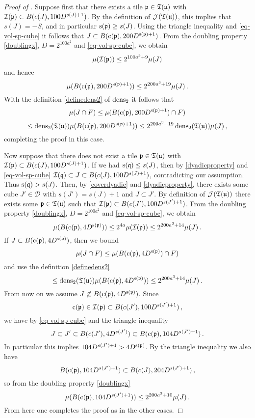 \begin{proof}[Proof of ]
    Suppose first that there exists a tile ${\mathfrak p} \in {\mathfrak T}({\mathfrak u})$ with ${\mathcal{I}}({\mathfrak p}) \subset B(c(J), 100 D^{s(J) + 1})$. By the definition of $\mathcal{J}({\mathfrak T}({\mathfrak u}))$, this implies that $s(J) = -S$, and in particular ${\mathrm{s}}({\mathfrak p}) \ge s(J)$. Using the triangle inequality and \eqref{eq-vol-sp-cube} it follows that $J \subset B({\mathrm{c}}({\mathfrak p}), 200 D^{{\mathrm{s}}({\mathfrak p}) + 1})$. From the doubling property \eqref{doublingx}, $D=2^{100a^2}$ and \eqref{eq-vol-sp-cube}, we obtain
    $$
        \mu({\mathcal{I}}({\mathfrak p})) \le 2^{100a^3 + 9} \mu(J)
    $$
    and hence
    $$
        \mu( B({\mathrm{c}}({\mathfrak p}), 200 D^{{\mathrm{s}}({\mathfrak p}) + 1})) \le 2^{200a^3 +19} \mu(J)\,.
    $$
    With the definition \eqref{definedens2} of $\operatorname{\operatorname{dens}}_2$ it follows that
    $$
        \mu(J \cap F) \le \mu( B({\mathrm{c}}({\mathfrak p}), 200 D^{{\mathrm{s}}({\mathfrak p}) + 1}) \cap F)
    $$
    $$
        \le \operatorname{\operatorname{dens}}_2({\mathfrak T}({\mathfrak u})) \mu( B({\mathrm{c}}({\mathfrak p}), 200 D^{{\mathrm{s}}({\mathfrak p}) + 1})) \le 2^{200a^3 +19} \operatorname{\operatorname{dens}}_2({\mathfrak T}({\mathfrak u}))\mu(J)\,,
    $$
    completing the proof in this case.

    Now suppose that there does not exist a tile ${\mathfrak p} \in {\mathfrak T}({\mathfrak u})$ with ${\mathcal{I}}({\mathfrak p}) \subset B(c(J), 100 D^{s(J) + 1})$. If we had ${\mathrm{s}}({\mathfrak q}) \le s(J)$, then by \eqref{dyadicproperty} and \eqref{eq-vol-sp-cube} ${\mathcal{I}}({\mathfrak q}) \subset J \subset B(c(J), 100 D^{s(J) + 1})$, contradicting our assumption. Thus ${\mathrm{s}}({\mathfrak q}) > s(J)$. Then, by \eqref{coverdyadic} and \eqref{dyadicproperty}, there exists some cube $J' \in \mathcal{D}$ with $s(J') = s(J) + 1$ and $J \subset J'$. By definition of $\mathcal{J}({\mathfrak T}({\mathfrak u}))$ there exists some ${\mathfrak p} \in {\mathfrak T}({\mathfrak u})$ such that ${\mathcal{I}}({\mathfrak p}) \subset B(c(J'), 100 D^{s(J') + 1})$. From the doubling property \eqref{doublingx}, $D=2^{100a^2}$ and \eqref{eq-vol-sp-cube}, we obtain
    \begin{equation}
        \label{eq-measure-comparison-1}
        \mu(B({\mathrm{c}}({\mathfrak p}), 4D^{{\mathrm{s}}({\mathfrak p})})) \le 2^{4a} \mu({\mathcal{I}}({\mathfrak p})) \le 2^{200a^3 + 14} \mu(J)\,.
    \end{equation}
    If $J \subset B({\mathrm{c}}({\mathfrak p}), 4 D^{{\mathrm{s}}({\mathfrak p})})$, then we bound
    $$
        \mu(J \cap F) \le \mu(B({\mathrm{c}}({\mathfrak p}), 4D^{{\mathrm{s}}({\mathfrak p})}) \cap F)
    $$
    and use the definition \eqref{definedens2}
    $$
        \le \operatorname{\operatorname{dens}}_2({\mathfrak T}({\mathfrak u})) \mu(B({\mathrm{c}}({\mathfrak p}), 4D^{{\mathrm{s}}({\mathfrak p})})) \le 2^{200a^3 + 14} \mu(J)\,.
    $$
    From now on we assume $J \not \subset B({\mathrm{c}}({\mathfrak p}), 4 D^{{\mathrm{s}}({\mathfrak p})})$.
    Since
    \begin{equation*}
        {\mathrm{c}}({\mathfrak p}) \in {\mathcal{I}}({\mathfrak p}) \subset B(c(J'), 100 D^{s(J') + 1})\, ,
    \end{equation*}
    we have by \eqref{eq-vol-sp-cube} and the triangle inequality
    $$
        J \subset J' \subset B(c(J'), 4D^{s(J')}) \subset B({\mathrm{c}}({\mathfrak p}), 104 D^{s(J') + 1})\,.
    $$
    In particular this implies $104 D^{s(J') + 1} > 4D^{{\mathrm{s}}({\mathfrak p})}$. By the triangle inequality we also have
    $$
        B({\mathrm{c}}({\mathfrak p}), 104 D^{s(J') + 1}) \subset B(c(J), 204 D^{s(J') + 1})\,,
    $$
    so from the doubling property \eqref{doublingx}
    $$
        \mu( B({\mathrm{c}}({\mathfrak p}), 104 D^{s(J') + 1})) \le 2^{200a^3 + 10} \mu(J)\,.
    $$
    From here one completes the proof as in the other cases.
\end{proof}


